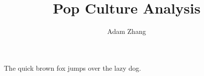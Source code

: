 \documentclass[mla8]{mla}
\title{Pop Culture Analysis}
\author{Adam Zhang}
\date{\mladate}
\begin{document}
\begin{paper}
  The quick brown fox jumps over the lazy dog.
\end{paper}
\end{document}
